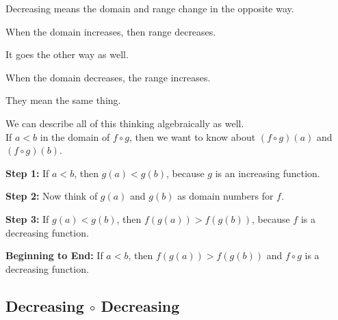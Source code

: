 \documentclass{ximera}
\begin{document}
\begin{warning}

Decreasing means the domain and range change in the opposite way.

When the domain increases, then range decreases.

It goes the other way as well.

When the domain decreases, the range increases.

They mean the same thing.


\end{warning}






We can describe all of this thinking algebraically as well. \\


If $a < b$ in the domain of $f \circ g$, then we want to know about $(f \circ g)(a)$  and $(f \circ g)(b)$.



\textbf{Step 1:}  If $a < b$, then $g(a) < g(b)$, because $g$ is an increasing function.


\textbf{Step 2:}  Now think of $g(a)$ and $g(b)$ as domain numbers for $f$.


\textbf{Step 3:}  If $g(a) < g(b)$, then $f(g(a)) > f(g(b))$, because $f$ is a decreasing function.


\textbf{Beginning to End:} If $a < b$, then $f(g(a)) > f(g(b))$ and $f \circ g$ is a decreasing function.














































\subsection*{Decreasing $\circ$ Decreasing}
\end{document}

